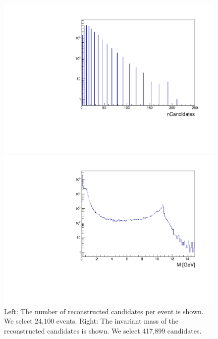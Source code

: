 \documentclass[a4paper,11pt,twosided,final,german,openbib,pdftex,listof=totoc,bibliography=totoc]{scrbook}
\begin{document}
\begin{figure}[h!]
	\centering
	\begin{minipage}[b]{0.45\linewidth}
		\centering
		\includegraphics[width=\textwidth]{Cuts/nCandAll.pdf}
	\end{minipage}
	\hspace{0.5cm}
	\begin{minipage}[b]{0.45\linewidth}
		\centering
		\includegraphics[width=\textwidth]{Cuts/Mall.pdf}
	\end{minipage}
	\caption[Number Of Candidates And Invariant Mass (No Cuts)]{Left: The number of reconstructed candidates per event is shown. We select 24,100 events.
		Right: The invariant mass of the reconstructed candidates is shown. We select 417,899 candidates.}
	\label{fig:nCandAll}
\end{figure}
\end{document}
